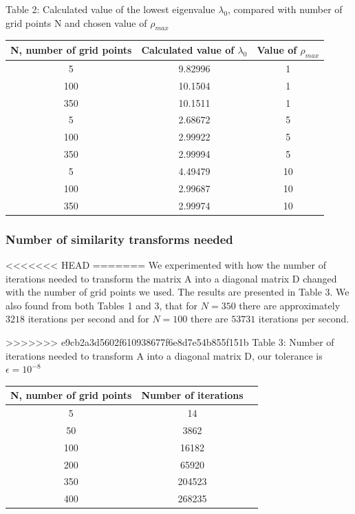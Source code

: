 \documentclass[norsk,a4paper,12pt]{article}
\begin{document}
Table 2: Calculated value of the lowest eigenvalue $\lambda_0$, compared with number of grid points N and chosen value of $\rho_{max}$
\par
\vspace{2mm}

\begin{tabular}{|c|c|c|}\hline
     {\bf N, number of grid points} & {\bf Calculated value of $\lambda_0$ } & {\bf Value of $\rho_{max}$} \\ \hline
     5 & 9.82996 & 1\\
     100 & 10.1504 & 1\\
     350 & 10.1511 & 1\\ \hline
     5 & 2.68672 & 5\\
     100 & 2.99922 & 5\\
     350 & 2.99994 & 5\\ \hline
     5 &  4.49479 & 10\\
     100 & 2.99687  & 10\\
     350 & 2.99974 & 10 \\ \hline
  
\end{tabular}\par
\par
\vspace{3mm}

\subsubsection{Number of similarity transforms needed}
\par
\vspace{2mm}

<<<<<<< HEAD
=======
We experimented with how the number of iterations needed to transform the matrix A into a diagonal matrix D changed with the number of grid points we used. The results are presented in Table 3. We also found from both Tables 1 and 3, that for $N=350$ there are approximately $3218$ iterations per second and for $N=100$ there are $53731$ iterations per second.
\par
\vspace{3mm}


>>>>>>> e9cb2a3d5602f610938677f6e8d7e54b855f151b
Table 3: Number of iterations needed to transform A into a diagonal matrix D, our tolerance is $\epsilon = 10^{-8}$
\par
\vspace{3mm}
\begin{tabular}{|c|c|c|}\hline
     {\bf N, number of grid points} & {\bf Number of iterations}\\ \hline
     5 & 14\\
     50 & 3862\\
     100 & 16182\\
     200 & 65920\\
     350 & 204523 \\ 
     400 & 268235\\\hline
\end{tabular}\par
  
\end{document}
